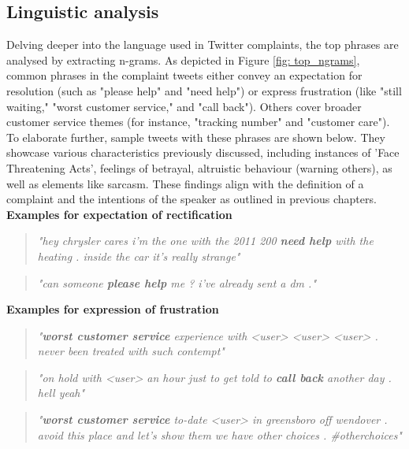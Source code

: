 \subsection{Linguistic analysis}
Delving deeper into the language used in Twitter complaints, the top phrases are analysed by extracting n-grams. As depicted in Figure \ref{fig: top_ngrams}, common phrases in the complaint tweets either convey an expectation for resolution (such as "please help" and "need help") or express frustration (like "still waiting," "worst customer service," and "call back"). Others cover broader customer service themes (for instance, "tracking number" and "customer care"). To elaborate further, sample tweets with these phrases are shown below. They showcase various characteristics previously discussed, including instances of 'Face Threatening Acts', feelings of betrayal, altruistic behaviour (warning others), as well as elements like sarcasm. These findings align with the definition of a complaint and the intentions of the speaker as outlined in previous chapters.\\

\textbf{Examples for expectation of rectification}
\begin{quote}
    \textit{"hey chrysler cares i'm the one with the 2011 200 \textbf{need help} with the heating . inside the car it's really strange"}
\end{quote}
\begin{quote}
    \textit{"can someone \textbf{please help} me ? i've already sent a dm ."}
\end{quote}
\textbf{Examples for expression of frustration}
\begin{quote}
    \textit{"\textbf{worst customer service} experience with <user> <user> <user> . never been treated with such contempt"}
\end{quote}
\begin{quote}
    \textit{"on hold with <user> an hour just to get told to \textbf{call back} another day . hell yeah"}
\end{quote}
\begin{quote}
    \textit{"\textbf{worst customer service} to-date <user> in greensboro off wendover . avoid this place and let's show them we have other choices . \#otherchoices"}
\end{quote}


